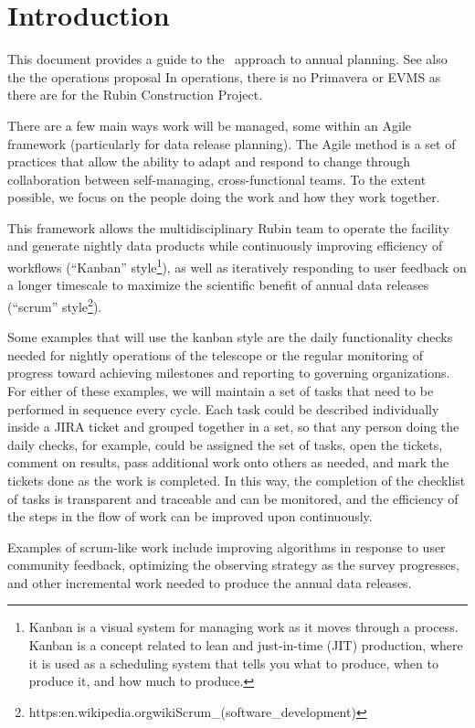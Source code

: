 \section{Introduction}


This document provides a guide to the \VRO \   approach to annual planning.
See also the the operations proposal 
In operations, there is no \gls{Primavera} or \gls{EVMS} as there are for the Rubin Construction Project.

There are a few main ways work will be managed, some within an Agile framework (particularly for data release planning). 
The Agile method is a set of practices that allow the ability to adapt and respond to change through collaboration between self-managing, cross-functional teams.  
To the extent possible, we focus on the people doing the work and how they work together. 

This framework allows the multidisciplinary Rubin team to operate the facility and generate nightly data products while continuously improving efficiency of workflows (``Kanban'' style\footnote{Kanban is a visual system for managing work as it moves through a process. 
Kanban is a concept related to lean and just-in-time (JIT) production, where it is used as a scheduling system that tells you what to produce, when to produce it, and how much to produce.}), 
as well as iteratively responding to user feedback on a longer timescale to maximize the scientific benefit of annual data releases (``scrum'' style\footnote{https:\/\/en.wikipedia.org\/wiki\/Scrum\_(software\_development)}).  

Some examples that will use the kanban style are the daily functionality checks needed for nightly operations of the telescope or the regular monitoring of progress toward achieving milestones and reporting to governing organizations.
For either of these examples, we will maintain a set of tasks that need to be performed in sequence every cycle.
Each task could be described individually inside a JIRA ticket and grouped together in a set, so that any person doing the daily checks, for example, could be assigned the set of tasks, open the tickets, comment on results, pass additional work onto others as needed, and mark the tickets done as the work is completed.
In this way, the completion of the checklist of tasks is transparent and traceable and can be monitored, and the efficiency of the steps in the flow of work can be improved upon continuously.

Examples of scrum-like work include improving algorithms in response to user community feedback, optimizing the observing strategy as the survey progresses, and other incremental work needed to produce the annual data releases.

